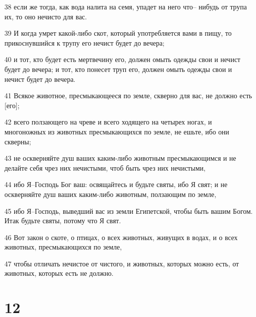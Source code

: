 \par 38 если же тогда, как вода налита на семя, упадет на него что-- нибудь от трупа их, то оно нечисто для вас.
\par 39 И когда умрет какой-либо скот, который употребляется вами в пищу, то прикоснувшийся к трупу его нечист будет до вечера;
\par 40 и тот, кто будет есть мертвечину его, должен омыть одежды свои и нечист будет до вечера; и тот, кто понесет труп его, должен омыть одежды свои и нечист будет до вечера.
\par 41 Всякое животное, пресмыкающееся по земле, скверно для вас, не должно есть [его];
\par 42 всего ползающего на чреве и всего ходящего на четырех ногах, и многоножных из животных пресмыкающихся по земле, не ешьте, ибо они скверны;
\par 43 не оскверняйте душ ваших каким-либо животным пресмыкающимся и не делайте себя чрез них нечистыми, чтоб быть чрез них нечистыми,
\par 44 ибо Я--Господь Бог ваш: освящайтесь и будьте святы, ибо Я свят; и не оскверняйте душ ваших каким-либо животным, ползающим по земле,
\par 45 ибо Я--Господь, выведший вас из земли Египетской, чтобы быть вашим Богом. Итак будьте святы, потому что Я свят.
\par 46 Вот закон о скоте, о птицах, о всех животных, живущих в водах, и о всех животных, пресмыкающихся по земле,
\par 47 чтобы отличать нечистое от чистого, и животных, которых можно есть, от животных, которых есть не должно.

\chapter{12}

